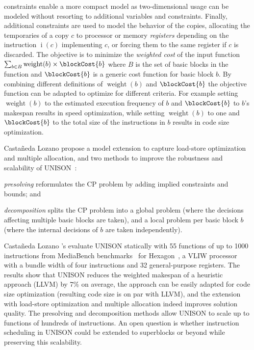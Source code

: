 \documentclass[acmsmall,authorversion,nonacm]{acmart}
\newcommand{\noMathVar}[2]{\operatorname{#1}(#2)}
\newcommand{\var}[2]{$\noMathVar{#1}{#2}$}
\newcommand{\textSummation}[2]{\textstyle\sum_{#1}#2}
\newcommand{\exitWeightSymbol}{\operatorname{weight}}
\newcommand{\exitWeight}[1]{\exitWeightSymbol(#1)}
\begin{document}
constraints enable a more compact model as two-dimensional usage can
be modeled without resorting to additional variables and constraints.
Finally, additional constraints are used to model the behavior of the
copies, allocating the temporaries of a copy $c$ to processor or
memory \emph{registers} depending on the instruction \var{i}{c}
implementing $c$, or forcing them to the same register if $c$ is
discarded.
The objective is to minimize the \emph{weighted cost} of the input
function
$\textSummation{b \in B}{\exitWeight{b} \times \blockCost{b}}$
where $B$ is the set of basic blocks in the function and
$\blockCost{b}$ is a generic cost function for basic block $b$.
By combining different definitions of $\exitWeight{b}$ and
$\blockCost{b}$ the objective function can be adapted to optimize for
different criteria.
For example setting $\exitWeight{b}$ to the estimated execution
frequency of $b$ and $\blockCost{b}$ to $b$'s makespan results in
speed optimization, while setting $\exitWeight{b}$ to one and
$\blockCost{b}$ to the total size of the instructions in $b$ results
in code size optimization.

Casta\~{n}eda Lozano \etal{} propose a model extension to capture
load-store optimization and multiple allocation, and two methods to
improve the robustness and scalability of UNISON~\cite{Castaneda2014}:
\begin{inparaitem}[]
\item \emph{presolving} reformulates the CP problem by adding implied
  constraints and bounds; and
\item \emph{decomposition} splits the CP problem into a global problem
  (where the decisions affecting multiple basic blocks are taken), and
  a local problem per basic block $b$ (where the internal decisions of
  $b$ are taken independently).
\end{inparaitem}

Casta\~{n}eda Lozano \etal{}'s evaluate UNISON statically with 55
functions of up to 1000 instructions from MediaBench
benchmarks~\cite{Lee1997} for Hexagon~\cite{Codrescu2014}, a VLIW
processor with a bundle width of four instructions and 32
general-purpose registers.
The results show that UNISON reduces the weighted makespan of a
heuristic approach (LLVM) by 7\% on average, the approach can be
easily adapted for code size optimization (resulting code size is on
par with LLVM), and the extension with load-store optimization and
multiple allocation indeed improves solution quality.
The presolving and decomposition methods allow UNISON to scale up to
functions of hundreds of instructions.
An open question is whether instruction scheduling in UNISON could be
extended to superblocks or beyond while preserving this scalability.
\end{document}

